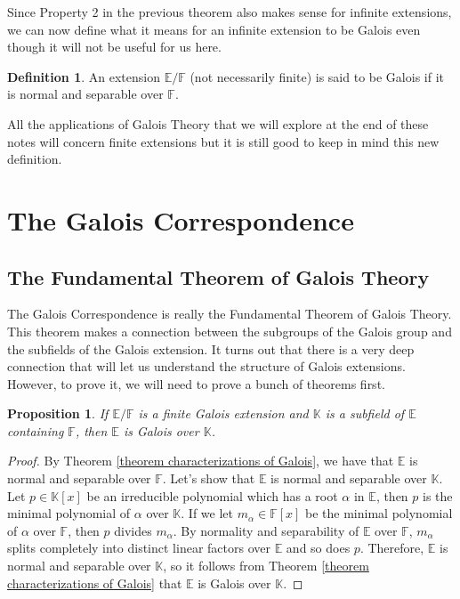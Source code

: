 \documentclass{article}
\theoremstyle{plain}
\newtheorem{proposition}[theorem]{Proposition}
\theoremstyle{definition}
\newtheorem*{definition}{Definition}
\newcommand{\F}{\mathbb{F}}
\newcommand{\E}{\mathbb{E}}
\newcommand{\K}{\mathbb{K}}
\begin{document}
Since Property 2 in the previous theorem also makes sense for infinite extensions, we can now define what it means for an infinite extension to be Galois even though it will not be useful for us here.

\begin{definition}
    An extension  $\E / \F$ (not necessarily finite) is said to be Galois if it is normal and separable over $\F$.
\end{definition}

All the applications of Galois Theory that we will explore at the end of these notes will concern finite extensions but it is still good to keep in mind this new definition.

\section{The Galois Correspondence} \label{galois_correspondence}

\subsection{The Fundamental Theorem of Galois Theory}

The Galois Correspondence is really the Fundamental Theorem of Galois Theory. This theorem makes a connection between the subgroups of the Galois group and the subfields of the Galois extension. It turns out that there is a very deep connection that will let us understand the structure of Galois extensions. However, to prove it, we will need to prove a bunch of theorems first.

\begin{proposition}
\label{galois extension is galois over subfields}
    If $\E / \F$ is a finite Galois extension and $\K$ is a subfield of $\E$ containing $\F$, then $\E$ is Galois over $\K$.
\end{proposition}

\begin{proof}
    By Theorem \ref{theorem characterizations of Galois}, we have that $\E$ is normal and separable over $\F$. Let's show that $\E$ is normal and separable over $\K$. Let $p \in \K[x]$ be an irreducible polynomial which has a root $\alpha$ in $\E$, then $p$ is the minimal polynomial of $\alpha$ over $\K$. If we let $m_{\alpha} \in \F[x]$ be the minimal polynomial of $\alpha$ over $\F$, then $p$ divides $m_{\alpha}$. By normality and separability of $\E$ over $\F$, $m_{\alpha}$ splits completely into distinct linear factors over $\E$ and so does $p$. Therefore, $\E$ is normal and separable over $\K$, so it follows from Theorem \ref{theorem characterizations of Galois} that $\E$ is Galois over $\K$.
\end{proof}
\end{document}
